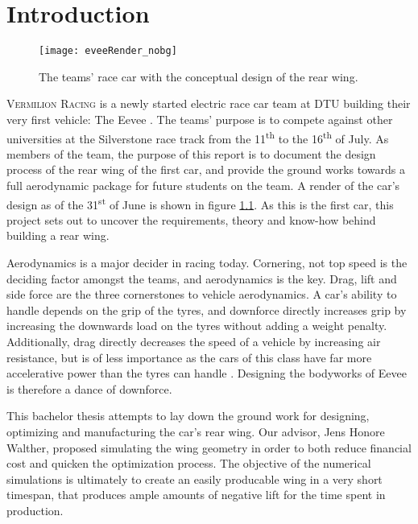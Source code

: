 \chapter{Introduction}

  \begin{figure}
    \texttt{[image: eveeRender\_nobg]}
    \caption{The teams' race car with the conceptual design of the rear wing.}
    \label{fig:EeveeRender}
  \end{figure}

  \textsc{Vermilion Racing} is a newly started electric race car team at DTU building their very first vehicle: The Eevee \cite{bulba}. The teams' purpose is to compete against other universities at the Silverstone race track from the 11\textsuperscript{th} to the 16\textsuperscript{th} of July. As members of the team, the purpose of this report is to document the design process of the rear wing of the first car, and provide the ground works towards a full aerodynamic package for future students on the team. A render of the car's design as of the 31\textsuperscript{st} of June is shown in figure \ref{fig:EeveeRender}. As this is the first car, this project sets out to uncover the requirements, theory and know-how behind building a rear wing.

  Aerodynamics is a major decider in racing today. Cornering, not top speed is the deciding factor amongst the teams, and aerodynamics is the key. Drag, lift and side force are the three cornerstones to vehicle aerodynamics. A car's ability to handle depends on the grip of the tyres, and downforce directly increases grip by increasing the downwards load on the tyres without adding a weight penalty. Additionally, drag directly decreases the speed of a vehicle by increasing air resistance, but is of less importance as the cars of this class have far more accelerative power than the tyres can handle \cite{jkatz}. Designing the bodyworks of Eevee is therefore a dance of downforce.

  This bachelor thesis attempts to lay down the ground work for designing, optimizing and manufacturing the car's rear wing. Our advisor, Jens Honore Walther, proposed simulating the wing geometry in order to both reduce financial cost and quicken the optimization process. The objective of the numerical simulations is ultimately to create an easily producable wing in a very short timespan, that produces ample amounts of negative lift for the time spent in production.

